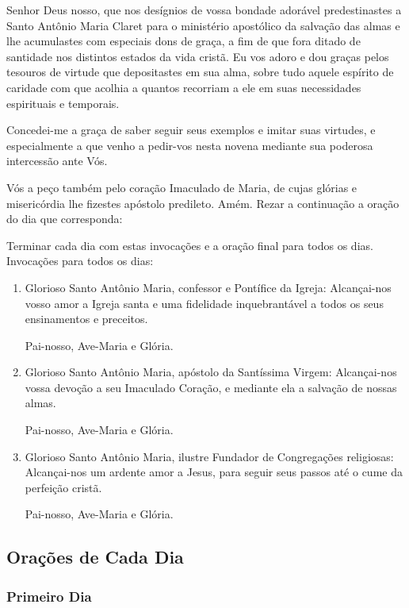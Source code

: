 \documentclass[a4paper,14pt]{extarticle} \usepackage[utf8]{inputenc}
\begin{document}
Senhor Deus nosso, que nos desígnios de vossa bondade adorável predestinastes a Santo Antônio Maria Claret para o ministério apostólico da salvação das almas e lhe acumulastes com especiais dons de graça, a fim de que fora ditado de santidade nos distintos estados da vida cristã.
Eu vos adoro e dou graças pelos tesouros de virtude que depositastes em sua alma, sobre tudo aquele espírito de caridade com que acolhia a quantos recorriam a ele em suas necessidades espirituais e temporais.

Concedei-me a graça de saber seguir seus exemplos e imitar suas virtudes, e especialmente a que venho a pedir-vos nesta novena mediante sua poderosa intercessão ante Vós.

Vós a peço também pelo coração Imaculado de Maria, de cujas glórias e misericórdia lhe fizestes apóstolo predileto. Amém. Rezar a continuação a oração do dia que corresponda:

Terminar cada dia com estas invocações e a oração final para todos os dias. Invocações para todos os dias:

\begin{enumerate}
  \item Glorioso Santo Antônio Maria, confessor e Pontífice da Igreja:
    Alcançai-nos vosso amor a Igreja santa e uma fidelidade inquebrantável a todos os seus ensinamentos e preceitos.

    Pai-nosso, Ave-Maria e Glória.
  \item Glorioso Santo Antônio Maria, apóstolo da Santíssima Virgem:
    Alcançai-nos vossa devoção a seu Imaculado Coração, e mediante ela a salvação de nossas almas.

    Pai-nosso, Ave-Maria e Glória.
  \item Glorioso Santo Antônio Maria, ilustre Fundador de Congregações religiosas:
    Alcançai-nos um ardente amor a Jesus, para seguir seus passos até o cume da perfeição cristã.

    Pai-nosso, Ave-Maria e Glória. 
\end{enumerate}

\subsection{Orações de Cada Dia}

\subsubsection{Primeiro Dia}
\end{document}
